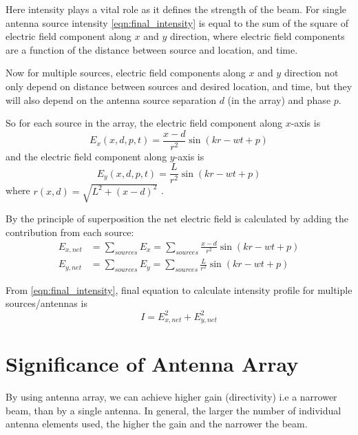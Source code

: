 Here intensity plays a vital role as it defines the strength of the beam. For single antenna source intensity \eqref{eqn:final_intensity} is equal to the sum of the square of electric field component along $x$ and $y$ direction, where electric field components are a function of the distance between source and location, and time.

Now for multiple sources, electric field components along $x$ and $y$ direction not only depend on distance between sources and desired location, and time, but they will also depend on the antenna source separation $d$ (in the array) and phase $p$.

So for each source in the array, the electric field component along $x$-axis is
%
\begin{equation}
{E}_x(x,d,p,t) = \frac{x-d}{r^2}\sin(kr-wt+p)
\end{equation}
%
and the electric field component along $y$-axis is
%
\begin{equation}
{E}_y(x,d,p,t) = \frac{L}{r^2}\sin(kr-wt+p)
\end{equation}
%
where $r(x,d) = \sqrt{L^2+(x-d)^2}$ .

By the principle of superposition the net electric field is calculated by adding the contribution from each source:
%
\begin{equation}
   \begin{aligned}
      E_{x,net} &= \sum_{sources} E_x = \sum_{sources} \frac{x-d}{r^2}\sin(kr-wt+p)\\
      E_{y,net} &= \sum_{sources} E_y = \sum_{sources} \frac{L}{r^2}\sin(kr-wt+p)
   \end{aligned}
\end{equation}

From \eqref{eqn:final_intensity}, final equation to calculate intensity profile for multiple sources/antennas is
%
\begin{equation}
   I = E^2_{x,net} + E^2_{y,net}
\end{equation}

\section{Significance of Antenna Array}

By using antenna array, we can achieve higher gain (directivity) i.e a narrower beam, than by a single antenna. In general, the larger the number of individual antenna elements used, the higher the gain and the narrower the beam.

